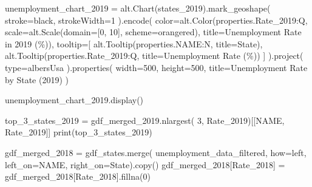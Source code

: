 \documentclass[
  letterpaper,
  DIV=11,
  numbers=noendperiod]{scrartcl}
\newenvironment{Shaded}{\begin{snugshade}}{\end{snugshade}}
\newcommand{\BuiltInTok}[1]{\textcolor[rgb]{0.00,0.23,0.31}{#1}}
\newcommand{\DecValTok}[1]{\textcolor[rgb]{0.68,0.00,0.00}{#1}}
\newcommand{\NormalTok}[1]{\textcolor[rgb]{0.00,0.23,0.31}{#1}}
\newcommand{\OperatorTok}[1]{\textcolor[rgb]{0.37,0.37,0.37}{#1}}
\newcommand{\StringTok}[1]{\textcolor[rgb]{0.13,0.47,0.30}{#1}}
\begin{document}
\begin{Shaded}
\begin{Highlighting}[]
\NormalTok{unemployment\_chart\_2019 }\OperatorTok{=}\NormalTok{ alt.Chart(states\_2019).mark\_geoshape(}
\NormalTok{    stroke}\OperatorTok{=}\StringTok{\textquotesingle{}black\textquotesingle{}}\NormalTok{,}
\NormalTok{    strokeWidth}\OperatorTok{=}\DecValTok{1}
\NormalTok{).encode(}
\NormalTok{    color}\OperatorTok{=}\NormalTok{alt.Color(}\StringTok{\textquotesingle{}properties.Rate\_2019:Q\textquotesingle{}}\NormalTok{,}
\NormalTok{                    scale}\OperatorTok{=}\NormalTok{alt.Scale(domain}\OperatorTok{=}\NormalTok{[}\DecValTok{0}\NormalTok{, }\DecValTok{10}\NormalTok{], scheme}\OperatorTok{=}\StringTok{\textquotesingle{}orangered\textquotesingle{}}\NormalTok{),}
\NormalTok{                    title}\OperatorTok{=}\StringTok{\textquotesingle{}Unemployment Rate in 2019 (\%)\textquotesingle{}}\NormalTok{),}
\NormalTok{    tooltip}\OperatorTok{=}\NormalTok{[}
\NormalTok{        alt.Tooltip(}\StringTok{\textquotesingle{}properties.NAME:N\textquotesingle{}}\NormalTok{, title}\OperatorTok{=}\StringTok{\textquotesingle{}State\textquotesingle{}}\NormalTok{),}
\NormalTok{        alt.Tooltip(}\StringTok{\textquotesingle{}properties.Rate\_2019:Q\textquotesingle{}}\NormalTok{, title}\OperatorTok{=}\StringTok{\textquotesingle{}Unemployment Rate (\%)\textquotesingle{}}\NormalTok{)}
\NormalTok{    ]}
\NormalTok{).project(}
    \BuiltInTok{type}\OperatorTok{=}\StringTok{\textquotesingle{}albersUsa\textquotesingle{}}
\NormalTok{).properties(}
\NormalTok{    width}\OperatorTok{=}\DecValTok{500}\NormalTok{,}
\NormalTok{    height}\OperatorTok{=}\DecValTok{500}\NormalTok{,}
\NormalTok{    title}\OperatorTok{=}\StringTok{\textquotesingle{}Unemployment Rate by State (2019)\textquotesingle{}}
\NormalTok{)}

\NormalTok{unemployment\_chart\_2019.display()}

\NormalTok{top\_3\_states\_2019 }\OperatorTok{=}\NormalTok{ gdf\_merged\_2019.nlargest(}
    \DecValTok{3}\NormalTok{, }\StringTok{\textquotesingle{}Rate\_2019\textquotesingle{}}\NormalTok{)[[}\StringTok{\textquotesingle{}NAME\textquotesingle{}}\NormalTok{, }\StringTok{\textquotesingle{}Rate\_2019\textquotesingle{}}\NormalTok{]]}
\BuiltInTok{print}\NormalTok{(top\_3\_states\_2019)}

\NormalTok{gdf\_merged\_2018 }\OperatorTok{=}\NormalTok{ gdf\_states.merge(}
\NormalTok{    unemployment\_data\_filtered, how}\OperatorTok{=}\StringTok{\textquotesingle{}left\textquotesingle{}}\NormalTok{, left\_on}\OperatorTok{=}\StringTok{\textquotesingle{}NAME\textquotesingle{}}\NormalTok{, right\_on}\OperatorTok{=}\StringTok{\textquotesingle{}State\textquotesingle{}}\NormalTok{).copy()}
\NormalTok{gdf\_merged\_2018[}\StringTok{\textquotesingle{}Rate\_2018\textquotesingle{}}\NormalTok{] }\OperatorTok{=}\NormalTok{ gdf\_merged\_2018[}\StringTok{\textquotesingle{}Rate\_2018\textquotesingle{}}\NormalTok{].fillna(}\DecValTok{0}\NormalTok{)}


\end{Highlighting}
\end{Shaded}
\end{document}
